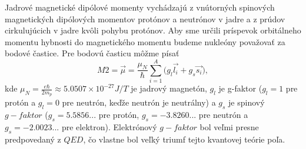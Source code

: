 \documentclass[../../main.tex]{subfiles}
\begin{document}
Jadrové magnetické dipólové momenty vychádzajú z vnútorných spinových magnetických dipólových momentov protónov a neutrónov v jadre a z prúdov cirkulujúcich v jadre kvôli pohybu protónov. Aby sme určili príspevok orbitálneho momentu hybnosti do magnetického momentu budeme nukleóny považovať za bodové častice. Pre bodovú časticu môžme písať 
\begin{equation}
M2=\vec{\mu}=\frac{\mu_N}{\hbar}\sum_{i=1}^A\big( g_l\vec{l_i} + g_s\vec{s_i} \big),
\end{equation}
kde $\mu_N=\frac{e\hbar}{2m_p}\approx5.0507\times 10^{-27}J/T$ je jadrový magnetón, $g_l$ je g-faktor ($g_l=1$ pre protón a $g_l=0$ pre neutrón, keďže neutrón je neutrálny) a $g_s$ je spinový $g-faktor$ ($g_s=5.5856...$ pre protón, $g_s=-3.8260...$ pre neutrón a $g_s=-2.0023...$ pre elektron). Elektrónový $g-faktor$ bol veľmi presne predpovedaný z $QED$, čo vlastne bol veľký triumf tejto kvantovej teórie poľa.
\end{document}
